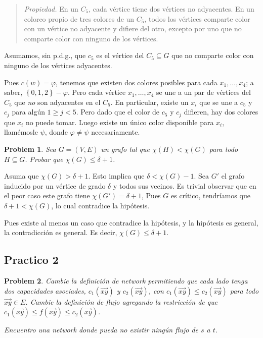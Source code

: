 \documentclass[a4paper]{article}
\newtheorem{problem}{Problem}
\newtheorem{problem}{Problem}
\begin{document}
\small
\begin{quote}

\textit{Propiedad.} En un $C_5$, cada vértice tiene dos vértices no adyacentes.
En un coloreo propio de tres colores de un $C_5$, todos los vértices comparte
color con un vértice no adyacente y difiere del otro, excepto por uno que no
comparte color con ninguno de los vértices.

\end{quote}
\normalsize

Asumamos, sin p.d.g., que $c_5$ es el vértice del $C_5 \subseteq G$ que no
comparte color con ninguno de los vértices adyacentes. 

Pues $c(w) = \varphi$, tenemos que existen dos colores posibles para cada $x_1,
\ldots, x_4$; a saber, $\left\{ 0, 1, 2 \right\} - \varphi$. Pero cada vértice
$x_1, \ldots, x_4$ se une a un par de vértices del $C_5$ que \textit{no} son
adyacentes en el $C_5$. En particular, existe un $x_i$ que se une a $c_5$ y
$c_j$ para algún $1 \geq j < 5$. Pero dado que el color de $c_5$ y $c_j$
difieren, hay dos colores que $x_i$ no puede tomar. Luego existe un único color
disponible para $x_i$, llamémosle $\psi$, donde $\varphi \neq \psi$
necesariamente. 




\pagebreak 

\begin{problem}
    Sea $G = (V, E) $ un grafo tal que $\chi(H) < \chi(G)$ para todo $H
    \subseteq G$. Probar que $\chi(G) \leq \delta + 1$.
\end{problem}

Asuma que $\chi(G) > \delta + 1$. Esto implica que $\delta < \chi(G) - 1$. Sea
$G'$ el grafo inducido por un vértice de grado $\delta$ y todos sus vecinos. Es
trivial observar que en el peor caso este grafo tiene $\chi(G') = \delta + 1$,
Pues $G$ es crítico, tendríamos que $\delta + 1 < \chi(G)$, lo cual contradice
la hipótesis.

Pues existe al menos un caso que contradice la hipótesis, y la hipótesis es
general, la contradicción es general. Es decir, $\chi(G) \leq \delta + 1$.

\pagebreak
\subsection{Practico 2}

\begin{problem}
    Cambie la definición de network permitiendo que cada lado tenga dos
    capacidades asociades, $c_1(\overrightarrow{xy})$ y
    $c_2(\overrightarrow{xy})$, con $c_1(\overrightarrow{xy}) \leq
    c_2(\overrightarrow{xy})$ para todo $\overrightarrow{xy} \in E$. Cambie la
    definición de flujo agregando la restricción de que
    $c_{1}(\overrightarrow{xy}) \leq f(\overrightarrow{xy}) \leq
    c_2(\overrightarrow{xy})$.

    Encuentro una network donde pueda no existir ningún flujo de $s$ a $t$.
\end{problem}
\end{document}
